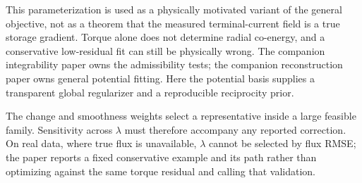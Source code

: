 This parameterization is used as a physically motivated variant of the general
objective, not as a theorem that the measured terminal-current field is a true
storage gradient. Torque alone does not determine radial co-energy, and a
conservative low-residual fit can still be physically wrong. The companion
integrability paper owns the admissibility tests; the companion reconstruction
paper owns general potential fitting. Here the potential basis supplies a
transparent global regularizer and a reproducible reciprocity prior.

The change and smoothness weights select a representative inside a large
feasible family. Sensitivity across $\lambda$ must therefore accompany any
reported correction. On real data, where true flux is unavailable, $\lambda$
cannot be selected by flux RMSE; the paper reports a fixed conservative example
and its path rather than optimizing against the same torque residual and calling
that validation.
